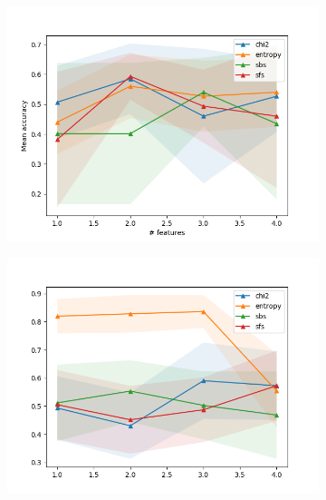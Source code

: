 \begin{figure}[htbp]
  \centering
  \begin{subfigure}[b]{0.475\textwidth}
      \centering
      \includegraphics[width=\textwidth]{../plots_with_std_fill/ANNd1.png}
      \caption[]%
      {{\small}}
      \label{fig:ANN_MIAS}
  \end{subfigure}
  \hfill
  \begin{subfigure}[b]{0.475\textwidth}
      \centering
      \includegraphics[width=\textwidth]{../plots_with_std_fill/ANNd2.png}
      \caption[]%
      {{\small}}
      \label{fig:ANN_EN}
  \end{subfigure}


\end{figure}
